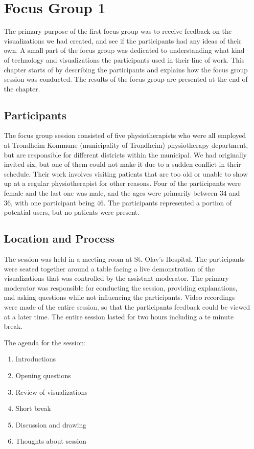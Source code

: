 \chapter{Focus Group 1}
\label{ch:focusGroup1}
The primary purpose of the first focus group was to receive feedback on the visualizations we had created, and see if the participants had any ideas of their own. A small part of the focus group was dedicated to understanding what kind of technology and visualizations the participants used in their line of work. This chapter starts of by describing the participants and explains how the focus group session was conducted. The results of the focus group are presented at the end of the chapter.

\section{Participants}
The focus group session consisted of five physiotherapists who were all employed at Trondheim Kommune (municipality of Trondheim) physiotherapy department, but are responsible for different districts within the municipal. We had originally invited six, but one of them could not make it due to a sudden conflict in their schedule. Their work involves visiting patients that are too old or unable to show up at a regular physiotherapist for other reasons. Four of the participants were female and the last one was male, and the ages were primarily between 34 and 36, with one participant being 46. The participants represented a portion of potential users, but no patients were present.


\section{Location and Process}
The session was held in a meeting room at St. Olav's Hospital. The participants were seated together around a table facing a live demonstration of the visualizations that was controlled by the assistant moderator. The primary moderator was responsible for conducting the session, providing explanations, and asking questions while not influencing the participants. Video recordings were made of the entire session, so that the participants feedback could be viewed at a later time. The entire session lasted for two hours including a te minute break.

The agenda for the session:
\vspace{-8mm}
\begin{enumerate}[itemsep=0cm, parsep=0cm]
  \item Introductions
  \item Opening questions
  \item Review of visualizations
  \item Short break
  \item Discussion and drawing
  \item Thoughts about session
\end{enumerate}

